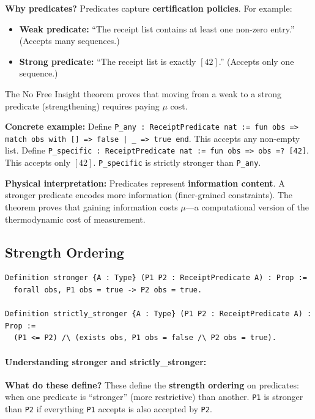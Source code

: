 \textbf{Why predicates?} Predicates capture \textbf{certification policies}. For example:
\begin{itemize}
    \item \textbf{Weak predicate:} ``The receipt list contains at least one non-zero entry.'' (Accepts many sequences.)
    \item \textbf{Strong predicate:} ``The receipt list is exactly $[42]$.'' (Accepts only one sequence.)
\end{itemize}
The No Free Insight theorem proves that moving from a weak to a strong predicate (strengthening) requires paying $\mu$ cost.

\textbf{Concrete example:} Define \texttt{P\_any : ReceiptPredicate nat := fun obs => match obs with [] => false | \_ => true end}. This accepts any non-empty list. Define \texttt{P\_specific : ReceiptPredicate nat := fun obs => obs =? [42]}. This accepts only $[42]$. \texttt{P\_specific} is strictly stronger than \texttt{P\_any}.


\textbf{Physical interpretation:} Predicates represent \textbf{information content}. A stronger predicate encodes more information (finer-grained constraints). The theorem proves that gaining information costs $\mu$---a computational version of the thermodynamic cost of measurement.

\subsection{Strength Ordering}

\begin{lstlisting}
Definition stronger {A : Type} (P1 P2 : ReceiptPredicate A) : Prop :=
  forall obs, P1 obs = true -> P2 obs = true.

Definition strictly_stronger {A : Type} (P1 P2 : ReceiptPredicate A) : Prop :=
  (P1 <= P2) /\ (exists obs, P1 obs = false /\ P2 obs = true).
\end{lstlisting}

\paragraph{Understanding stronger and strictly\_stronger:}

\textbf{What do these define?} These define the \textbf{strength ordering} on predicates: when one predicate is ``stronger'' (more restrictive) than another. \texttt{P1} is stronger than \texttt{P2} if everything \texttt{P1} accepts is also accepted by \texttt{P2}.

